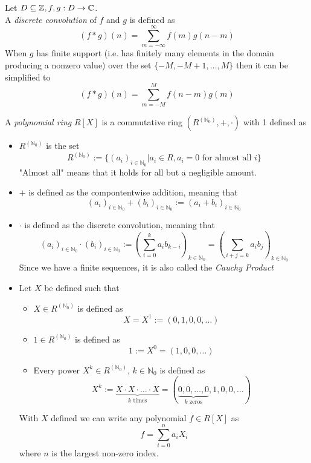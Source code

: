 \documentclass{article}
\begin{document}
\begin{definition}
	Let $D \subseteq \mathbb{Z}, f,g : D \rightarrow \mathbb{C}$.\\
	A \emph{discrete convolution} of $f$ and $g$ is defined as
	\[
		(f * g)(n) = \sum_{m=-\infty}^\infty f(m) g(n-m)
	\]
	When $g$ has finite support (i.e. has finitely many elements in the domain producing a nonzero value)
	over the set $\{-M, -M+1, \dots, M\}$ then it can be simplified to
	\[
		(f * g)(n) = \sum_{m = -M}^M f(n-m)g(m)
	\]
\end{definition}
\begin{definition}
	A \emph{polynomial ring} $R[X]$ is a commutative ring $(R^{(\mathbb{N}_0)}, +, \cdot)$ with 1 defined as
	\begin{itemize}
		\item $R^{(\mathbb{N}_0)}$ is the set
		\[
			R^{(\mathbb{N}_0)} :=
			\{
				(a_i)_{i \in \mathbb{N}_0} | a_i \in R, a_i = 0 \text{ for almost all } i
			\}
		\]
		"Almost all" means that it holds for all but a negligible amount.
		\item $+$ is defined as the compontentwise addition, meaning that
		\[
			(a_i)_{i \in \mathbb{N}_0} + (b_i)_{i \in \mathbb{N}_0} := (a_i+b_i)_{i \in \mathbb{N}_0}
		\]
		\item $\cdot$ is defined as the discrete convolution, meaning that
		\[
			(a_i)_{i \in \mathbb{N}_0} \cdot (b_i)_{i \in \mathbb{N}_0}
			:= \left( \sum_{i=0}^k a_i b_{k-i} \right)_{k \in \mathbb{N}_0}
			= \left( \sum_{i+j=k} a_i b_j \right)_{k \in \mathbb{N}_0}
		\]
		Since we have a finite sequences, it is also called the \emph{Cauchy Product}
		\item Let $X$ be defined such that
		\begin{itemize}
			\item $X \in R^{(\mathbb{N}_0)}$ is defined as
			\[
				X = X^1 := (0,1,0,0,\dots)
			\]
			\item $1 \in R^{(\mathbb{N}_0)}$ is defined as
			\[
				1 := X^0 = (1,0,0,\dots)
			\]
			\item Every power $X^k \in R^{(\mathbb{N}_0)}$, $k \in \mathbb{N}_0$ is defined as
			\[
				X^k := \underbrace{X \cdot X \cdot \dots \cdot X}_{k \text{ times}}
				= (\underbrace{0,0,\dots,0}_{k \text{ zeros}},1,0,0,\dots)
			\]
		\end{itemize}
		With $X$ defined we can write any polynomial $f \in R[X]$ as
		\[
			f = \sum_{i=0}^n a_i X_i
		\]
		where $n$ is the largest non-zero index.
	\end{itemize}
\end{definition}
\end{document}
